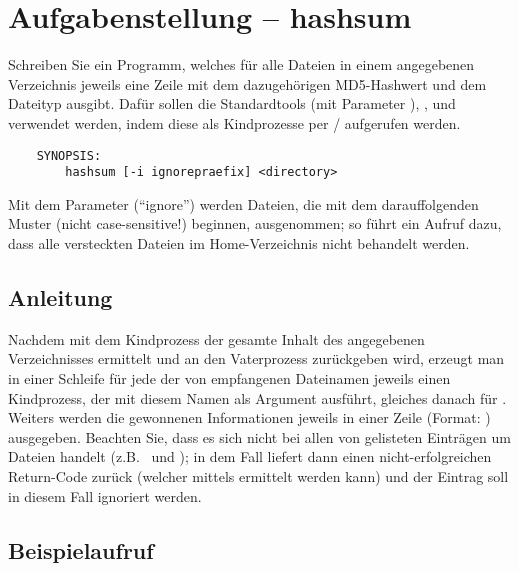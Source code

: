 




\section*{Aufgabenstellung -- hashsum}

Schreiben Sie ein Programm, welches für alle Dateien in einem angegebenen
Verzeichnis jeweils eine Zeile mit dem dazugehörigen MD5-Hashwert und dem
Dateityp ausgibt. Dafür sollen die Standardtools  (mit Parameter
), , und  verwendet werden, indem
diese als Kindprozesse per / aufgerufen
werden.

\begin{verbatim}
    SYNOPSIS:
        hashsum [-i ignorepraefix] <directory>
\end{verbatim}

Mit dem Parameter  (``ignore'') werden Dateien, die mit dem
darauffolgenden Muster (nicht case-sensitive!) beginnen, ausgenommen;
so führt ein Aufruf  dazu, dass alle versteckten
Dateien im Home-Verzeichnis nicht behandelt werden.

\subsection*{Anleitung}
Nachdem mit dem Kindprozess  der gesamte Inhalt des angegebenen
Verzeichnisses ermittelt und an den Vaterprozess zurückgeben wird, erzeugt man
in einer Schleife für jede der von  empfangenen Dateinamen jeweils
einen Kindprozess, der  mit diesem Namen als Argument ausführt,
gleiches danach für . Weiters werden die gewonnenen Informationen
jeweils in einer Zeile (Format: )
ausgegeben. Beachten Sie, dass es sich nicht bei allen von 
gelisteten Einträgen um Dateien handelt (z.B.\  und
); in dem Fall liefert dann  einen
nicht-erfolgreichen Return-Code zurück (welcher mittels
 ermittelt werden kann) und der Eintrag
soll in diesem Fall ignoriert werden.

\subsection*{Beispielaufruf}

